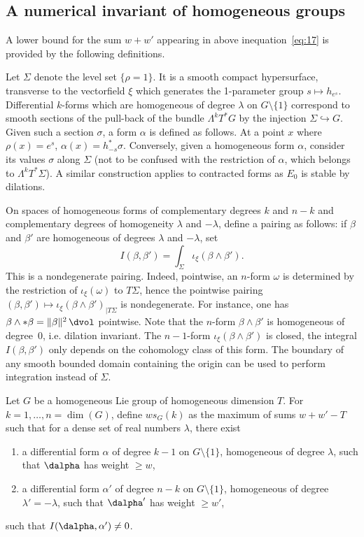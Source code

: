 \subsection{A numerical invariant of homogeneous groups}

A lower bound for the sum $w+w'$ appearing in above inequation~\eqref{eq:17} is provided by the following definitions.

Let $\Sigma$ denote the level set $\{\rho=1\}$. It is a smooth compact hypersurface, transverse to the vectorfield $\xi$ which generates the 1-parameter group $s\mapsto h_{e^s}$. Differential $k$-forms which are homogeneous of degree $\lambda$ on $G\setminus\{1\}$ correspond to smooth sections of the pull-back of the bundle $\Lambda^k T^* G$ by the injection $\Sigma\hookrightarrow G$. Given such a section $\sigma$, a form $\alpha$ is defined as follows. At a point $x$ where $\rho(x)=e^s$, $\alpha(x)= h_{-s}^*\sigma$. Conversely, given a homogeneous form $\alpha$, consider its values $\sigma$ along $\Sigma$ (not to be confused with the restriction of $\alpha$, which belongs to $\Lambda^k T^* \Sigma$). A similar construction applies to contracted forms as $E_0$ is stable by dilations.

On spaces of homogeneous forms of complementary degrees $k$ and $n-k$ and complementary degrees of homogeneity $\lambda$ and $-\lambda$, define a pairing as follows: if $\beta$ and $\beta'$ are homogeneous of degrees $\lambda$ and $-\lambda$, set
\[
I(\beta,\beta')=\int_{\Sigma}\iota_\xi(\beta\wedge\beta').
\]
This is a nondegenerate pairing. Indeed, pointwise, an $n$-form $\omega$ is determined by the restriction of $\iota_\xi(\omega)$ to $T\Sigma$, hence the pointwise pairing $(\beta,\beta')\mapsto \iota_\xi(\beta\wedge\beta')_{|T\Sigma}$ is nondegenerate. For instance, one has $\beta \wedge * \beta = \|\beta\|^2 \,\dvol$ pointwise. Note that the $n$-form $\beta\wedge\beta'$ is homogeneous of degree~$0$, i.e. dilation invariant. The $n-1$-form $\iota_\xi(\beta\wedge\beta')$ is closed, the integral $I(\beta,\beta')$ only depends on the cohomology class of this form. The boundary of any smooth bounded domain containing the origin can be used to perform integration instead of $\Sigma$.


\begin{defi}\label{dfi:wsG}
Let $G$ be a homogeneous Lie group of homogeneous dimension $T$. For $k=1,\dots,n= \dim(G)$, define $ws_G(k)$ as the maximum of sums $w+w'-T$ such that for a dense set of real numbers $\lambda$, there exist
\begin{enumerate}
\item a differential form $\alpha$ of degree $k-1$ on $G\setminus\{1\}$, homogeneous of degree $\lambda$, such that $\dalpha$ has weight $\geq w$,
\item a differential form $\alpha'$ of degree $n-k$ on $G\setminus\{1\}$, homogeneous of degree $\lambda'=-\lambda$, such that $\dalpha'$ has weight $\geq w'$,
\end{enumerate}
such that $ I(\dalpha,\alpha')\not=0$.
\end{defi}

